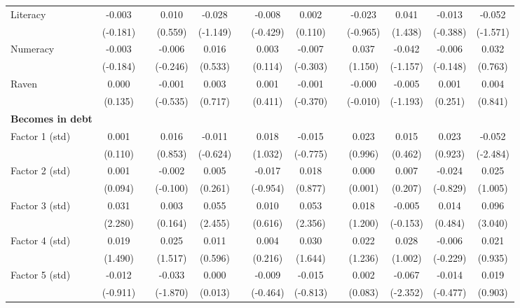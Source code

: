 \begin{table}[htbp]
{\begin{tabular}{lcccccccccccc}
    Literacy & -0.003 &   & 0.010 & -0.028 &   & -0.008 & 0.002 &   & -0.023 & 0.041 & -0.013 & -0.052 \\
      & (-0.181) &   & (0.559) & (-1.149) &   & (-0.429) & (0.110) &   & (-0.965) & (1.438) & (-0.388) & (-1.571) \\
    Numeracy & -0.003 &   & -0.006 & 0.016 &   & 0.003 & -0.007 &   & 0.037 & -0.042 & -0.006 & 0.032 \\
      & (-0.184) &   & (-0.246) & (0.533) &   & (0.114) & (-0.303) &   & (1.150) & (-1.157) & (-0.148) & (0.763) \\
    Raven & 0.000 &   & -0.001 & 0.003 &   & 0.001 & -0.001 &   & -0.000 & -0.005 & 0.001 & 0.004 \\
      & (0.135) &   & (-0.535) & (0.717) &   & (0.411) & (-0.370) &   & (-0.010) & (-1.193) & (0.251) & (0.841) \\
    \midrule
    \textbf{Becomes in debt} &   &   &   &   &   &   &   &   &   &   &   &  \\
    Factor 1 (std) & 0.001 &   & 0.016 & -0.011 &   & 0.018 & -0.015 &   & 0.023 & 0.015 & 0.023 & \cellcolor[rgb]{ 1,  1,  0}-0.052 \\
      & (0.110) &   & (0.853) & (-0.624) &   & (1.032) & (-0.775) &   & (0.996) & (0.462) & (0.923) & (-2.484) \\
    Factor 2 (std) & 0.001 &   & -0.002 & 0.005 &   & -0.017 & 0.018 &   & 0.000 & 0.007 & -0.024 & 0.025 \\
      & (0.094) &   & (-0.100) & (0.261) &   & (-0.954) & (0.877) &   & (0.001) & (0.207) & (-0.829) & (1.005) \\
    Factor 3 (std) & \cellcolor[rgb]{ 1,  1,  0}0.031 &   & 0.003 & \cellcolor[rgb]{ 1,  1,  0}0.055 &   & 0.010 & \cellcolor[rgb]{ 1,  1,  0}0.053 &   & 0.018 & -0.005 & 0.014 & \cellcolor[rgb]{ 1,  1,  0}0.096 \\
      & (2.280) &   & (0.164) & (2.455) &   & (0.616) & (2.356) &   & (1.200) & (-0.153) & (0.484) & (3.040) \\
    Factor 4 (std) & 0.019 &   & 0.025 & 0.011 &   & 0.004 & 0.030 &   & 0.022 & 0.028 & -0.006 & 0.021 \\
      & (1.490) &   & (1.517) & (0.596) &   & (0.216) & (1.644) &   & (1.236) & (1.002) & (-0.229) & (0.935) \\
    Factor 5 (std) & -0.012 &   & \cellcolor[rgb]{ 1,  1,  0}-0.033 & 0.000 &   & -0.009 & -0.015 &   & 0.002 & \cellcolor[rgb]{ 1,  1,  0}-0.067 & -0.014 & 0.019 \\
      & (-0.911) &   & (-1.870) & (0.013) &   & (-0.464) & (-0.813) &   & (0.083) & (-2.352) & (-0.477) & (0.903) \\

\end{tabular}}
\end{table}
